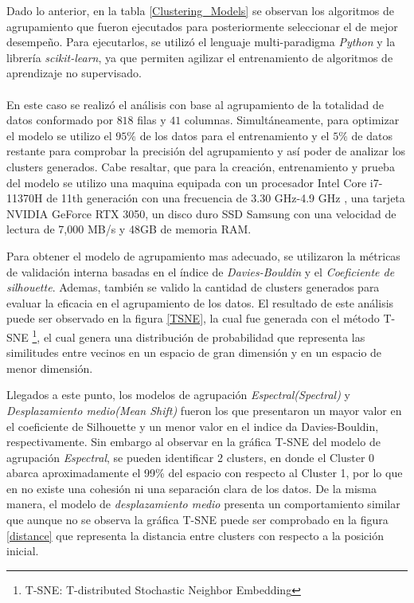 Dado lo anterior, en la tabla \ref{Clustering_Models} se observan los algoritmos de agrupamiento que fueron ejecutados para posteriormente seleccionar el de mejor desempeño. Para ejecutarlos, se utilizó el lenguaje multi-paradigma \textit{Python} y la librería \textit{scikit-learn}, ya que permiten agilizar el entrenamiento de algoritmos de aprendizaje no supervisado.
\\\\
En este caso se realizó el análisis con base al agrupamiento de la totalidad de datos conformado por $818$ filas y $41$ columnas. Simultáneamente, para optimizar el modelo se utilizo el $95\%$ de los datos para el entrenamiento y el $5\%$ de datos restante para comprobar la precisión del agrupamiento y así poder de analizar los clusters generados. Cabe resaltar, que para la creación, entrenamiento y prueba del modelo se utilizo una maquina equipada con un procesador Intel Core i7-11370H de 11th generación con una frecuencia de 3.30 GHz-4.9 GHz , una tarjeta NVIDIA GeForce RTX 3050, un disco duro SSD Samsung con una velocidad de lectura de  7,000 MB/s y 48GB de memoria RAM. 

Para obtener el modelo de agrupamiento mas adecuado, se utilizaron la métricas de validación interna basadas en el índice de \textit{Davies-Bouldin} y el \textit{Coeficiente de silhouette}. Ademas, también se valido la cantidad de clusters generados para evaluar la eficacia en el agrupamiento de los datos. El resultado de este análisis puede ser observado en la figura \ref{TSNE}, la cual fue generada con el método T-SNE \footnote{T-SNE: T-distributed Stochastic Neighbor Embedding}, el cual genera una distribución de probabilidad que representa las similitudes entre vecinos en un espacio de gran dimensión y en un espacio de menor dimensión. 

Llegados a este punto, los modelos de agrupación \textit{Espectral(Spectral)} y \textit{Desplazamiento medio(Mean Shift)}  fueron los que presentaron un mayor valor en el coeficiente de Silhouette y un menor valor en el indice da Davies-Bouldin, respectivamente. Sin embargo al observar en la gráfica T-SNE del modelo de agrupación \textit{Espectral}, se pueden identificar 2 clusters, en donde el Cluster 0 abarca aproximadamente el 99\% del espacio con respecto al Cluster 1, por lo que en no existe una cohesión ni una separación clara de los datos. De la misma manera, el modelo de \textit{desplazamiento medio} presenta un comportamiento similar que aunque no se observa la gráfica T-SNE puede ser comprobado en la figura \ref{distance} que representa la distancia entre clusters con respecto a la posición inicial.


